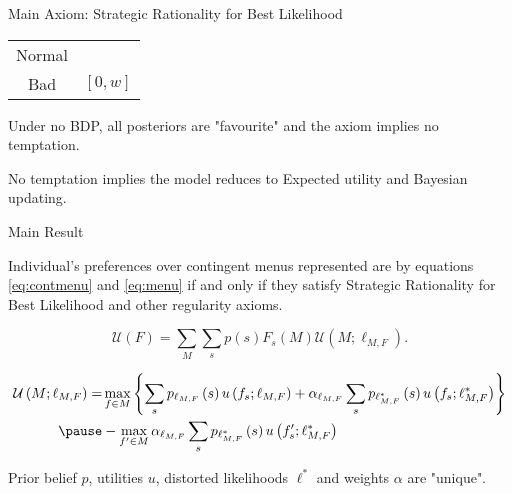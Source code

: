 \documentclass[usenames,dvipsnames,aspectratio=169,11pt, envcountsect, handout]{beamer}
\begin{document}
\begin{frame}[noframenumbering]{Main Axiom: Strategic Rationality for Best Likelihood}
\begin{table}[H]
\begin{minipage}{0.4\textwidth}
\begin{tabular}{c | c}
				{\color{blue}Normal} &                                                                                 \\
				Bad                  & \( \left[0, w \right] \)                                                        \\
			\end{tabular}
			\vspace{0.5cm} %
		\end{minipage} %
	\end{table} \pause

	\vfill

	Under no BDP, all posteriors are "favourite" and the axiom implies no temptation.

	\vfill

	No temptation implies the model reduces to Expected utility and Bayesian updating.
\end{frame}

\begin{frame}{Main Result}

	\begin{theorem}
		Individual's preferences over contingent menus represented are by equations \ref{eq:contmenu} and \ref{eq:menu} if and only if they satisfy Strategic Rationality for Best Likelihood and other regularity axioms.
	\end{theorem}

	\vfill

	\begin{equation}\label{eq:contmenu}
		\mathscr{U}(F)= \sum_{M} \sum_{s} p \left( s \right) F_{s} \left( M \right) \mathcal{U} \left(M ; \ell_{M, F} \right) .
	\end{equation}

	\vfill

	\begin{equation}\label{eq:menu}
		\begin{aligned}
			\mathcal{U} \left(M ; \ell_{M, F} \right) = & \max _{f \in M}\left\{\sum_{s} p_{\ell_{M, F}} \left( s \right) u \left( f_{s} ; \ell_{M, F} \right) + \alpha_{\ell_{M, F}} \sum_{s} p_{\ell^{*}_{M, F}} \left( s \right) u \left( f_{s} ; \ell^{*}_{M, F} \right) \right\} \\ \pause
			                                            & -\max _{f^{\prime} \in M} \alpha _{\ell_{M, F}} \sum_{s} p_{\ell^{*}_{M, F}} \left( s \right) u\left(f^{\prime}_{s} ; \ell^{*}_{M, F} \right) \:
		\end{aligned}
	\end{equation}

	\vfill

	Prior belief \( p \), utilities \( u \), distorted likelihoods \( \ell^{*} \) and weights \( \alpha \) are "unique".

\end{frame}
\end{document}

